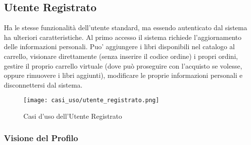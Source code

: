 \documentclass[a4paper, 10pt]{article}
\begin{document}
		\subsection{Utente Registrato}
			Ha le stesse funzionalità dell'utente standard, ma essendo autenticato dal 
			sistema ha ulteriori caratteristiche. 
			Al primo accesso il sistema richiede l'aggiornamento delle informazioni personali.
			Puo' aggiungere i libri disponibili nel catalogo al carrello, 
			visionare direttamente (senza inserire il 
			codice ordine) i propri ordini, gestire il proprio carrello virtuale 
			(dove può proseguire con l'acquisto se volesse, oppure rimuovere i libri aggiunti), 
			modificare le proprie informazioni personali e disconnettersi dal sistema.
			\begin{figure}[h]
				\centering
				\texttt{[image: casi\_uso/utente\_registrato.png]}
				\caption{Casi d'uso dell'Utente Registrato}
			\end{figure}
		\subsubsection{Visione del Profilo}
\end{document}
